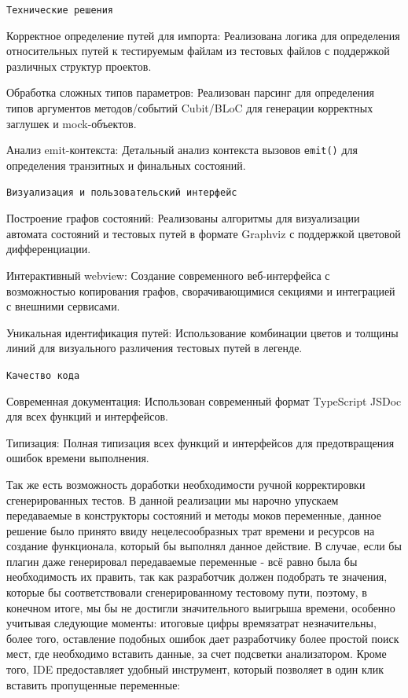 \documentclass[14pt, russian]{scrartcl}
\begin{document}
\texttt{Технические решения}
\begin{itemize*}
    \item Корректное определение путей для импорта: Реализована логика для определения относительных путей к тестируемым файлам из тестовых файлов с поддержкой различных структур проектов.
    \item Обработка сложных типов параметров: Реализован парсинг для определения типов аргументов методов/событий Cubit/BLoC для генерации корректных заглушек и mock-объектов.
    \item Анализ emit-контекста: Детальный анализ контекста вызовов \texttt{emit()} для определения транзитных и финальных состояний.
\end{itemize*}

\texttt{Визуализация и пользовательский интерфейс}
\begin{itemize*}
    \item Построение графов состояний: Реализованы алгоритмы для визуализации автомата состояний и тестовых путей в формате Graphviz с поддержкой цветовой дифференциации.
    \item Интерактивный webview: Создание современного веб-интерфейса с возможностью копирования графов, сворачивающимися секциями и интеграцией с внешними сервисами.
    \item Уникальная идентификация путей: Использование комбинации цветов и толщины линий для визуального различения тестовых путей в легенде.
\end{itemize*}

\texttt{Качество кода}
\begin{itemize*}
    \item Современная документация: Использован современный формат TypeScript JSDoc для всех функций и интерфейсов.
    \item Типизация: Полная типизация всех функций и интерфейсов для предотвращения ошибок времени выполнения.
\end{itemize*}

Так же есть возможность доработки необходимости ручной корректировки сгенерированных тестов. В данной реализации мы нарочно упускаем передаваемые в конструкторы состояний и методы моков переменные, данное решение было принято ввиду нецелесообразных трат времени и ресурсов
на создание функционала, который бы выполнял данное действие. В случае, если бы плагин даже генерировал передаваемые переменные - всё равно была бы необходимость их править, так как разработчик должен подобрать те значения, которые бы соответствовали сгенерированному тестовому пути, 
поэтому, в конечном итоге, мы бы не достигли значительного выигрыша времени, особенно учитывая следующие моменты: итоговые цифры времязатрат незначительны, более того, оставление подобных ошибок дает разработчику более простой поиск мест, где необходимо вставить данные, за счет подсветки анализатором.
Кроме того, IDE предоставляет удобный инструмент, который позволяет в один клик вставить пропущенные переменные:
\end{document}
